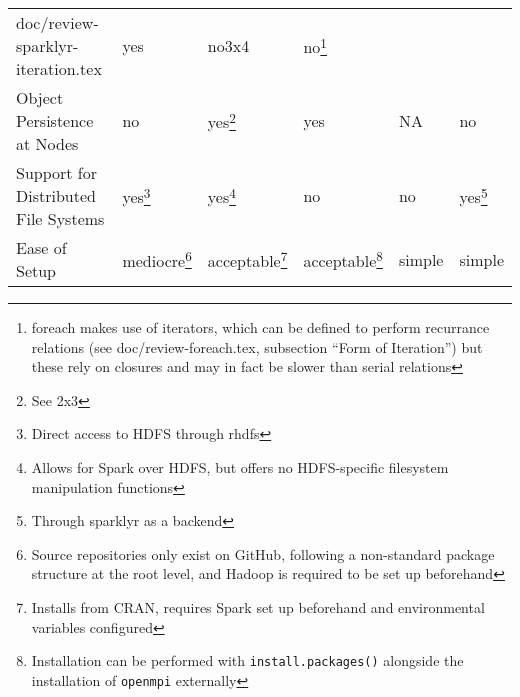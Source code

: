 \begin{table}[htbp]
\begin{tabular}{llllll}
{    doc/review-sparklyr-iteration.tex}                                   & yes                                                                   & no{3x4}                                       &
    no\footnote{foreach makes use of iterators, which can be defined to
      perform recurrance relations (see doc/review-foreach.tex, subsection
      ``Form of Iteration'') but these rely on closures and may in fact be
    slower than serial relations}                                                                                                                                                                                                                                     \\
    Object Persistence at Nodes                                          & no                                                                    & yes\footnote{See {2x3}}                       & yes
                                                                         & NA                                                                    & no                                                                                                                 \\
    Support for Distributed File Systems                                 & yes\footnote{Direct access to
    HDFS through rhdfs\cite{revo2013rhdfs}}                              & yes\footnote{Allows for
      Spark over HDFS, but offers no HDFS-specific filesystem manipulation
    functions}                                                           & no                                                                    & no                                            & yes\footnote{Through sparklyr as a backend}                        \\
    Ease of Setup                                                        & mediocre\footnote{Source repositories only exist on
      GitHub, following a non-standard package structure at the root level,
    and Hadoop is required to be set up beforehand}                      &
    acceptable\footnote{Installs from CRAN, requires Spark set up beforehand
    and environmental variables configured}                              & acceptable\footnote{Installation
      can be performed with
      \texttt{install.packages()} alongside the
    installation of \texttt{openmpi} externally}                  & simple                                                                & simple                                                                                                             \\

\end{tabular}
\end{table}
